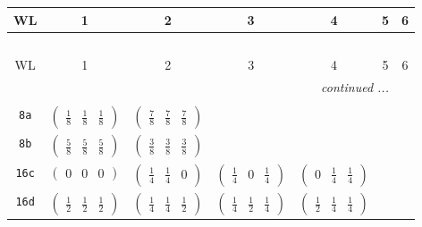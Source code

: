 \documentclass[fleqn,9pt,landscape]{jsarticle}
\begin{document}
\begin{center}
\renewcommand{\arraystretch}{1.2}
\begin{longtable}{ccccccc}
 \hline \hline
WL & 1 & 2 & 3 & 4 & 5 & 6 \\ \hline \endfirsthead

\multicolumn{6}{l}{\tablename\ \thetable{}} \\
 \hline \hline
WL & 1 & 2 & 3 & 4 & 5 & 6 \\ \hline \endhead

 \hline \hline
\multicolumn{6}{r}{\footnotesize\it continued ...} \\ \endfoot

 \hline \hline
\multicolumn{6}{r}{} \\ \endlastfoot

{\tt 8a} & $ \begin{pmatrix} \frac{1}{8} & \frac{1}{8} & \frac{1}{8} \end{pmatrix} $ & $ \begin{pmatrix} \frac{7}{8} & \frac{7}{8} & \frac{7}{8} \end{pmatrix} $ & $  $ & $  $ & $  $ & $  $ \\ \hline
{\tt 8b} & $ \begin{pmatrix} \frac{5}{8} & \frac{5}{8} & \frac{5}{8} \end{pmatrix} $ & $ \begin{pmatrix} \frac{3}{8} & \frac{3}{8} & \frac{3}{8} \end{pmatrix} $ & $  $ & $  $ & $  $ & $  $ \\ \hline
{\tt 16c} & $ \begin{pmatrix} 0 & 0 & 0 \end{pmatrix} $ & $ \begin{pmatrix} \frac{1}{4} & \frac{1}{4} & 0 \end{pmatrix} $ & $ \begin{pmatrix} \frac{1}{4} & 0 & \frac{1}{4} \end{pmatrix} $ & $ \begin{pmatrix} 0 & \frac{1}{4} & \frac{1}{4} \end{pmatrix} $ & $  $ & $  $ \\ \hline
{\tt 16d} & $ \begin{pmatrix} \frac{1}{2} & \frac{1}{2} & \frac{1}{2} \end{pmatrix} $ & $ \begin{pmatrix} \frac{1}{4} & \frac{1}{4} & \frac{1}{2} \end{pmatrix} $ & $ \begin{pmatrix} \frac{1}{4} & \frac{1}{2} & \frac{1}{4} \end{pmatrix} $ & $ \begin{pmatrix} \frac{1}{2} & \frac{1}{4} & \frac{1}{4} \end{pmatrix} $ & $  $ & $  $ \\ \hline

\end{longtable}
\end{center}
\end{document}
